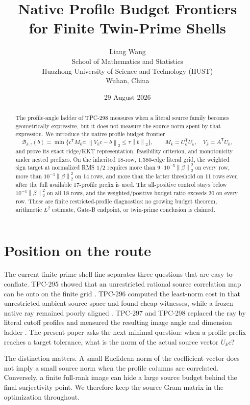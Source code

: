 \documentclass[10pt]{article}
\title{Native Profile Budget Frontiers\\
for Finite Twin-Prime Shells}
\author{Liang Wang\\
School of Mathematics and Statistics\\
Huazhong University of Science and Technology (HUST)\\
Wuhan, China}
\date{29 August 2026}
\newcommand{\norm}[1]{\left\lVert #1\right\rVert}
\newcommand{\B}{\mathcal B}
\begin{document}
\maketitle

\begin{abstract}
The profile-angle ladder of TPC-298 measures when a literal source family
becomes geometrically expressive, but it does not measure the source norm
spent by that expression.  We introduce the native profile budget frontier
\[
 \B_{k,\tau}(b)=\min\{c^{\mathsf T}M_kc:
 \norm{V_kc-b}_2\leq\tau\norm{b}_2\},
 \qquad M_k=U_k^{\mathsf T}U_k,\quad V_k=A^{\mathsf T}U_k,
 \]
and prove its exact ridge/KKT representation, feasibility criterion, and
monotonicity under nested prefixes.  On the inherited 18-row, 1,380-edge
literal grid, the weighted sign target at normalized RMS $1/2$ requires more
than $9\cdot10^{-5}\norm{\beta}_2^2$ on every row, more than
$10^{-3}\norm{\beta}_2^2$ on 14 rows, and more than the latter threshold on
11 rows even after the full available 17-profile prefix is used.  The
all-positive control stays below $10^{-4}\norm{\beta}_2^2$ on all 18 rows,
and the weighted/positive budget ratio exceeds 20 on every row.  These
are finite restricted-profile diagnostics: no growing budget theorem,
arithmetic $L^2$ estimate, Gate-B endpoint, or twin-prime conclusion is
claimed.
\end{abstract}

\section{Position on the route}

The current finite prime-shell line separates three questions that are easy
to conflate.  TPC-295 showed that an unrestricted rational source
correlation map can be onto on the finite grid \cite{tpc295}.  TPC-296
computed the least-norm cost in that unrestricted ambient source space and
found cheap witnesses, while a frozen native ray remained poorly aligned
\cite{tpc296}.  TPC-297 and TPC-298 replaced the ray by literal cutoff
profiles and measured the resulting image angle and dimension ladder
\cite{tpc297,tpc298}.  The present paper asks the next minimal question:
when a profile prefix reaches a target tolerance, what is the norm of the
actual source vector $U_kc$?

The distinction matters.  A small Euclidean norm of the coefficient vector
does not imply a small source norm when the profile columns are correlated.
Conversely, a finite full-rank image can hide a large source budget behind
the final surjectivity point.  We therefore keep the source Gram matrix in
the optimization throughout.
\end{document}
